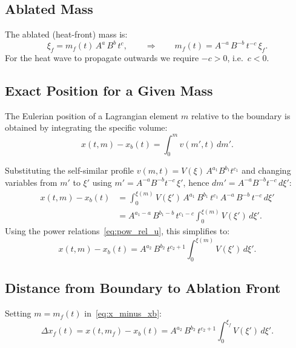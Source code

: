 \documentclass[11pt]{article}
\begin{document}
\subsection{Ablated Mass}

The ablated (heat-front) mass is:
\begin{equation}
  \xi_f = m_f(t)\,A^{a}\,B^{b}\,t^{c},
  \qquad\Longrightarrow\qquad
  m_f(t) = A^{-a}\,B^{-b}\,t^{-c}\,\xi_f.
  \label{eq:mf}
\end{equation}
For the heat wave to propagate outwards we require $-c > 0$, i.e.\ $c < 0$.

\subsection{Exact Position for a Given Mass}

The Eulerian position of a Lagrangian element $m$ relative to the boundary is obtained by integrating the specific volume:
\begin{equation}
  x(t,m) - x_b(t) = \int_0^{m} v(m',t)\,dm'.
  \label{eq:x_integral_def}
\end{equation}

Substituting the self-similar profile $v(m,t) = V(\xi)\,A^{a_1}B^{b_1}t^{c_1}$ and changing variables from $m'$ to $\xi'$ using $m' = A^{-a}B^{-b}t^{-c}\,\xi'$, hence $dm' = A^{-a}B^{-b}t^{-c}\,d\xi'$:
\begin{align}
  x(t,m) - x_b(t)
  &= \int_0^{\xi(m)} V(\xi')\,A^{a_1}\,B^{b_1}\,t^{c_1}\,
     A^{-a}\,B^{-b}\,t^{-c}\,d\xi' \nonumber\\[4pt]
  &= A^{a_1-a}\,B^{b_1-b}\,t^{c_1-c}
     \int_0^{\xi(m)} V(\xi')\,d\xi'.
  \label{eq:x_from_V_integral}
\end{align}
Using the power relations~\eqref{eq:pow_rel_u}, this simplifies to:
\begin{equation}
  \boxed{
  x(t,m) - x_b(t) = A^{a_2}\,B^{b_2}\,t^{c_2+1}
     \int_0^{\xi(m)} V(\xi')\,d\xi'.}
  \label{eq:x_minus_xb}
\end{equation}

\subsection{Distance from Boundary to Ablation Front}

Setting $m = m_f(t)$ in~\eqref{eq:x_minus_xb}:
\begin{equation}
  \Delta x_f(t) = x(t,m_f) - x_b(t)
  = A^{a_2}\,B^{b_2}\,t^{c_2+1}
    \int_0^{\xi_f} V(\xi')\,d\xi'.
  \label{eq:delta_xf}
\end{equation}
\end{document}
